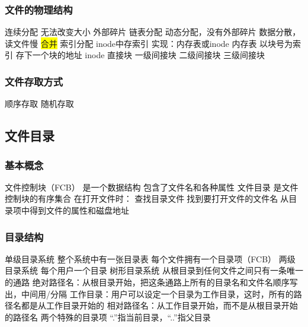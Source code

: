 \documentclass{ctexart}
\newcommand{\hl}[1]{\colorbox{yellow}{#1}}
\begin{document}
\subsubsection{文件的物理结构}
\begin{outline}
    \1 连续分配
        \2 无法改变大小
        \2 外部碎片
    \1 链表分配
        \2 动态分配，没有外部碎片
        \2 数据分散，读文件慢
        \2 \hl{合并}
    \1 索引分配
        \2 inode中存索引
        \2 实现：内存表或inode
        \2 内存表
            \3 以块号为索引
            \3 存下一个块的地址
        \2 inode
            \3 直接块
            \3 一级间接块
            \3 二级间接块
            \3 三级间接块
\end{outline}
\subsubsection{文件存取方式}
\begin{outline}
    \1 顺序存取
    \1 随机存取
\end{outline}
\subsection{文件目录}
\subsubsection{基本概念}
\begin{outline}
    \1 文件控制块（FCB）
        \2 是一个数据结构
        \2 包含了文件名和各种属性
    \1 文件目录
        \2 是文件控制块的有序集合
        \2 在打开文件时：
            \3 查找目录文件找到要打开文件的文件名从目录项中得到文件的属性和磁盘地址
\end{outline}
\subsubsection{目录结构}
\begin{outline}
    \1 单级目录系统
        \2 整个系统中有一张目录表
        \2 每个文件拥有一个目录项（FCB）
    \1 两级目录系统
        \2 每个用户一个目录
    \1 树形目录系统
        \2 从根目录到任何文件之间只有一条唯一的通路
            \3 绝对路径名：从根目录开始，把这条通路上所有的目录名和文件名顺序写出，中间用/分隔
            \3 工作目录：用户可以设定一个目录为工作目录，这时，所有的路径名都是从工作目录开始的
            \3 相对路径名：从工作目录开始，而不是从根目录开始的路径名
        \2 两个特殊的目录项
            \3 “.”指当前目录，“..”指父目录
\end{outline}
\end{document}
